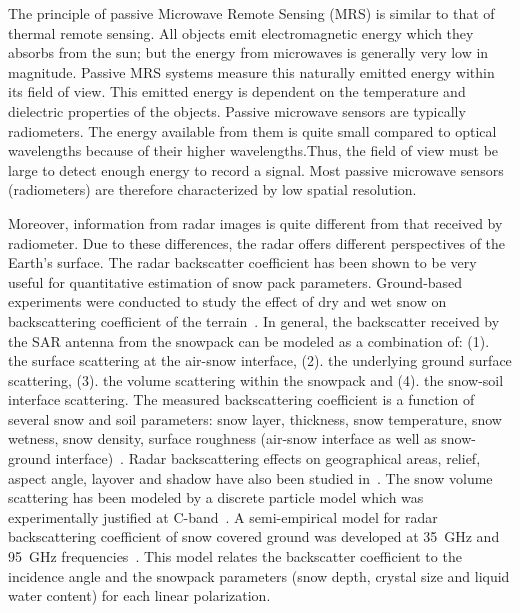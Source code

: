 The principle of passive Microwave Remote Sensing (MRS) is similar to that of thermal remote sensing. All objects emit electromagnetic energy which they absorbs from the sun; but the energy from microwaves is generally very low in magnitude. Passive MRS systems measure this naturally emitted energy within its field of view. This emitted energy is dependent on the temperature and dielectric properties of the objects. Passive microwave sensors are typically radiometers. The energy available from them is quite small compared to optical wavelengths because of their higher wavelengths.Thus, the field of view must be large to detect enough energy to record a signal. Most passive microwave sensors (radiometers) are therefore characterized by low spatial resolution.

Moreover, information from radar images is quite different from that received by radiometer. Due to these differences, the radar offers different perspectives of the Earth’s surface. The radar backscatter coefficient has been shown to be very useful for quantitative estimation of snow pack parameters. Ground-based experiments were conducted to study the effect of dry and wet snow on backscattering coefficient of the terrain~\citep{Stiles1980}. In general, the backscatter received by the SAR antenna from the snowpack can be modeled as a combination of: (1). the surface scattering at the air-snow interface, (2). the underlying ground surface scattering, (3). the volume scattering within the snowpack and (4). the snow-soil interface scattering. The measured backscattering coefficient is a function of several snow and soil parameters: snow layer, thickness, snow temperature, snow wetness, snow density, surface roughness (air-snow interface as well as snow-ground interface)~\citep{ulaby1986microwave}. Radar backscattering effects on geographical areas, relief, aspect angle, layover and shadow have also been studied in~\citep{Koskinen97,Nagler2000}. The snow volume scattering has been modeled by a discrete particle model which was experimentally justified at C-band~\citep{Kendra98,Koskinen2000}. A semi-empirical model for radar backscattering coefficient of snow covered ground was developed at 35~GHz and 95~GHz frequencies~\citep{Ulaby95}. This model relates the backscatter coefficient to the incidence angle and the snowpack parameters (snow depth, crystal size and liquid water content) for each linear polarization.  

